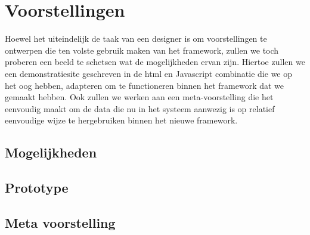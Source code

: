 \part{Voorstellingen}
\label{voorstellingen}

Hoewel het uiteindelijk de taak van een designer is om voorstellingen te ontwerpen die ten volste gebruik maken van het framework, zullen we toch proberen een beeld te schetsen wat de mogelijkheden ervan zijn. Hiertoe zullen we een demonstratiesite geschreven in de \ac{html} en Javascript combinatie die we op het oog hebben, adapteren om te functioneren binnen het framework dat we gemaakt hebben. Ook zullen we werken aan een meta-voorstelling die het eenvoudig maakt om de data die nu in het systeem aanwezig is op relatief eenvoudige wijze te hergebruiken binnen het nieuwe framework.

\chapter{Mogelijkheden}


\chapter{Prototype}


\chapter{Meta voorstelling}

